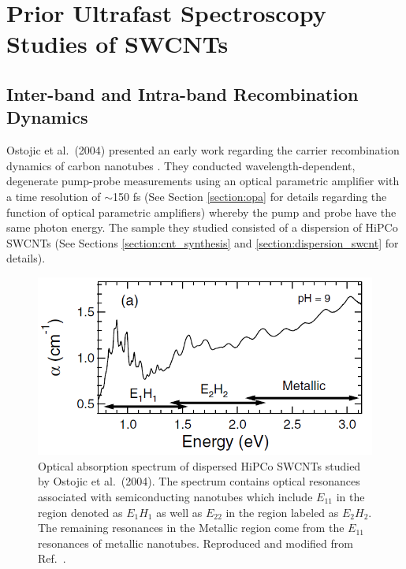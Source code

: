 \chapter{Prior Ultrafast Spectroscopy Studies of SWCNTs}

\section{Inter-band and Intra-band Recombination Dynamics}


Ostojic et al.\ (2004) presented an early work regarding the carrier recombination dynamics of carbon nanotubes \cite{ostojic2004interband}. They conducted wavelength-dependent, degenerate pump-probe measurements using an optical parametric amplifier with a time resolution of $\sim$150 fs (See Section \ref{section:opa} for details regarding the function of optical parametric amplifiers) whereby the pump and probe have the same photon energy. The sample they studied consisted of a dispersion of HiPCo SWCNTs (See Sections \ref{section:cnt_synthesis} and \ref{section:dispersion_swcnt} for details).

\begin{figure}[ht]
	\centering
	\includegraphics[scale=0.7]{images/chapter_prior_works/abs_gordana}

	\caption{Optical absorption spectrum of dispersed HiPCo SWCNTs studied by Ostojic et al.\ (2004). The spectrum contains optical resonances associated with semiconducting nanotubes which include $E_{11}$ in the region denoted as $E_{1} H_{1}$ as well as  $E_{22}$ in the region labeled as $E_{2} H_{2}$. The remaining resonances in the Metallic region come from the $E_{11}$ resonances of metallic nanotubes. Reproduced and modified from Ref.\ \cite{ostojic2004interband}.}
	\label{fig:abs_gordana}
\end{figure}



